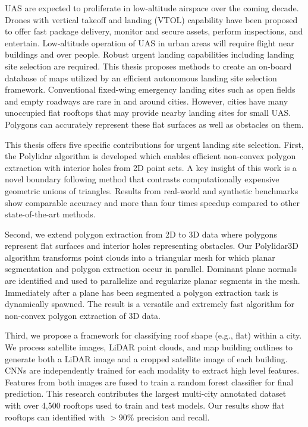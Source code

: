 \acf{UAS} are expected to proliferate in low-altitude airspace over the coming decade. Drones with vertical takeoff and landing (VTOL) capability have been proposed to offer fast package delivery, monitor and secure assets, perform inspections, and entertain. 
Low-altitude operation of UAS in urban areas will require flight near buildings and over people. Robust urgent landing capabilities including landing site selection are required.
This thesis proposes methods to create an on-board database of maps utilized by an efficient autonomous landing site selection framework. Conventional fixed-wing emergency landing sites such as open fields and empty roadways are rare in and around cities. However, cities have many unoccupied flat rooftops that may provide nearby landing sites for small UAS. Polygons can accurately represent these flat surfaces as well as obstacles on them.

This thesis offers five specific contributions for urgent landing site selection. First, the Polylidar algorithm is developed which enables efficient non-convex polygon extraction with interior holes from 2D point sets.  A key insight of this work is a novel boundary following method that contrasts computationally expensive geometric unions of triangles. Results from real-world and synthetic benchmarks show comparable accuracy and more than four times speedup compared to other state-of-the-art methods. 

Second, we extend polygon extraction from 2D to 3D data where polygons represent flat surfaces and interior holes representing obstacles. Our Polylidar3D algorithm transforms point clouds into a triangular mesh for which planar segmentation and polygon extraction occur in parallel. Dominant plane normals are identified and used to parallelize and regularize planar segments in the mesh. Immediately after a plane has been segmented a polygon extraction task is dynamically spawned. The result is a versatile and extremely fast algorithm for non-convex polygon extraction of 3D data.

Third, we propose a framework for classifying roof shape (e.g., flat) within a city. We process satellite images, LiDAR point clouds, and map building outlines to generate both a LiDAR image and a cropped satellite image of each building. \ac{CNN}s are independently trained for each modality to extract high level features. Features from both images are fused to train a random forest classifier for final prediction. This research contributes the largest multi-city annotated dataset with over 4,500 rooftops used to train and test models. Our results show flat rooftops can identified with $> 90\%$ precision and recall.

